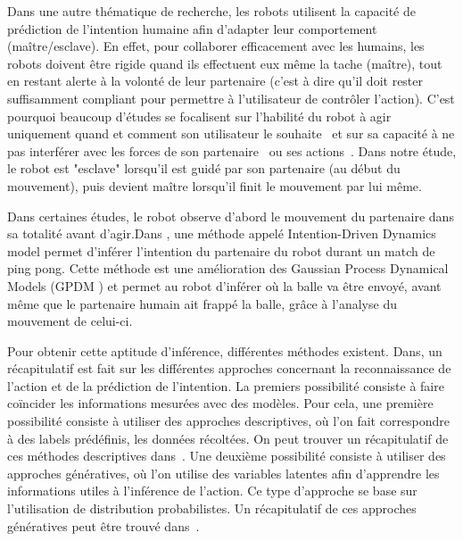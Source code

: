 \documentclass[utf8]{frontiersSCNS} %
\begin{document}
Dans une autre thématique de recherche, les robots utilisent la capacité de prédiction de l'intention humaine afin d'adapter leur comportement (maître/esclave). En effet, pour collaborer efficacement avec les humains, les robots doivent être rigide quand ils effectuent eux même la tache (maître), tout en restant alerte à la volonté de leur partenaire (c'est à dire qu'il doit rester suffisamment compliant pour permettre à l'utilisateur de contrôler l'action). C'est pourquoi beaucoup d'études se focalisent sur l’habilité du robot à agir uniquement quand et comment son utilisateur le souhaite~\citep{carlson2008human}\citep{soh2015learning} et sur sa capacité à ne pas interférer avec les forces de son partenaire~\citep{jarrasse2008can} ou ses actions~\citep{baraglia2016initiative}.
Dans notre étude, le robot est "esclave" lorsqu'il est guidé par son partenaire (au début du mouvement), puis devient maître lorsqu'il finit le mouvement par lui même.



Dans certaines études, le robot observe d'abord le mouvement du partenaire dans sa totalité avant d'agir.Dans \citep{wang2012probabilistic}, une méthode appelé Intention-Driven Dynamics model permet d'inférer l'intention du partenaire du robot durant un match de ping pong. Cette méthode est une amélioration des Gaussian Process Dynamical Models (GPDM \citep{wang2005gaussian}) et permet au robot d'inférer où la balle va être envoyé, avant même que le partenaire humain ait frappé la balle, grâce à l'analyse du mouvement de celui-ci.

Pour obtenir cette aptitude d'inférence, différentes méthodes existent.
Dans\citep{demiris2007prediction}, un récapitulatif est fait sur les différentes approches concernant la reconnaissance de l'action et de la prédiction de l’intention. La premiers possibilité consiste à faire coïncider les informations mesurées avec des modèles. Pour cela, une première possibilité consiste à utiliser des approches descriptives, où l'on fait correspondre à des labels prédéfinis, les données récoltées. On peut trouver un récapitulatif de ces méthodes descriptives dans~\citep{csibra2007obsessed}. Une deuxième possibilité consiste à utiliser des approches génératives, où l'on utilise des variables latentes afin d'apprendre les informations utiles à l’inférence de l'action. Ce type d'approche se base sur l'utilisation de distribution probabilistes. Un récapitulatif de ces approches génératives peut être trouvé dans~\citep{buxton2003learning}.
\end{document}
